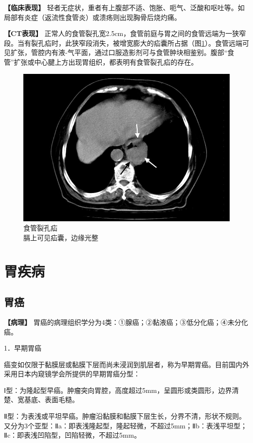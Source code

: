 \textbf{【临床表现】}
轻者无症状，重者有上腹部不适、饱胀、呃气、泛酸和呕吐等。如局部有炎症（返流性食管炎）或溃疡则出现胸骨后烧灼痛。

\textbf{【CT表现】}
正常人的食管裂孔宽2.5cm，食管前庭与胃之间的食管远端为一狭窄段。当有裂孔疝时，此狭窄段消失，被增宽膨大的疝囊所占据（图\ref{fig17-3}）。食管远端可见扩张，管腔内有液-气平面，通过口服造影剂可与食管肿块相鉴别。腹部“食管”扩张或中心腱上方出现胃组织，都表明有食管裂孔疝的存在。

\begin{figure}[!htbp]
 \centering
 \includegraphics[width=.7\textwidth,height=\textheight,keepaspectratio]{./images/Image00354.jpg}
 \captionsetup{justification=centering}
 \caption{食管裂孔疝\\{\small 膈上可见疝囊，边缘光整}}
 \label{fig17-3}
  \end{figure} 

\section{胃疾病}

\subsection{胃癌}

\textbf{【病理】}
胃癌的病理组织学分为4类：①腺癌；②黏液癌；③低分化癌；④未分化癌。

1．早期胃癌

癌变如仅限于黏膜层或黏膜下层而尚未浸润到肌层者，称为早期胃癌。目前国内外采用日本内窥镜学会所提供的早期胃癌分型：

Ⅰ型：为隆起型早癌。肿瘤突向胃腔，高度超过5mm，呈圆形或类圆形，边界清楚、宽基底、表面毛糙。

Ⅱ型：为表浅或平坦早癌。肿瘤沿黏膜和黏膜下层生长，分界不清，形状不规则。又分为3个亚型：Ⅱa：即表浅隆起型，隆起轻微，不超过5mm；Ⅱb：表浅平坦型；Ⅱc：即表浅凹陷型，凹陷轻微，不超过5mm。

